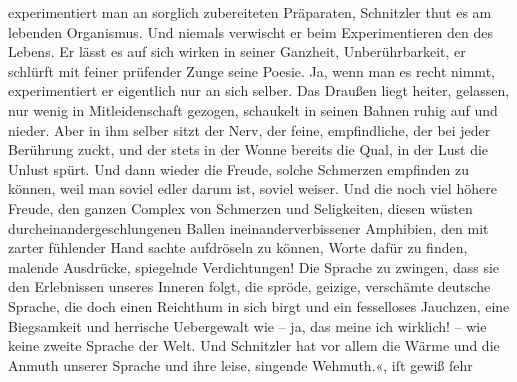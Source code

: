 \begin{ledgroupsized}[t]{13cm}
{{{                     experimentiert man an sorglich zubereiteten Präparaten, Schnitzler thut es am lebenden Organismus. Und niemals
                     verwischt er beim Experimentieren den  des
                     Lebens. Er lässt es auf sich wirken in seiner Ganzheit, Unberührbarkeit, er
                     schlürft mit feiner prüfender Zunge seine Poesie. Ja, wenn man es recht nimmt,
                     experimentiert er eigentlich nur an sich selber. Das Draußen liegt heiter,
                     gelassen, nur wenig in Mitleidenschaft gezogen, schaukelt in seinen Bahnen
                     ruhig auf und nieder. Aber in ihm selber sitzt der Nerv, der feine,
                     empfindliche, der bei jeder Berührung zuckt, und der stets in der Wonne bereits
                     die Qual, in der Lust die Unlust spürt. Und dann wieder die Freude, solche
                     Schmerzen empfinden zu können, weil man soviel edler darum ist, soviel weiser.
                     Und die noch viel höhere Freude, den ganzen Complex von Schmerzen und
                     Seligkeiten, diesen wüsten durcheinandergeschlungenen Ballen
                     ineinanderverbissener Amphibien, den mit zarter fühlender Hand sachte
                     aufdröseln zu können, Worte dafür zu finden, malende Ausdrücke, spiegelnde
                     Verdichtungen! Die Sprache zu zwingen, dass sie den Erlebnissen unseres Inneren
                     folgt, die spröde, geizige, verschämte deutsche Sprache, die doch einen
                     Reichthum in sich birgt und ein fesselloses Jauchzen, eine Biegsamkeit und
                     herrische Uebergewalt wie – ja, das meine ich wirklich! – wie keine zweite
                     Sprache der Welt. Und Schnitzler hat vor
                     allem die Wärme und die Anmuth unserer Sprache und ihre leise, singende
                     Wehmuth.«}}}\label{K_L02792-24h}, iſt {\pb}gewiß ſehr

\end{ledgroupsized}
